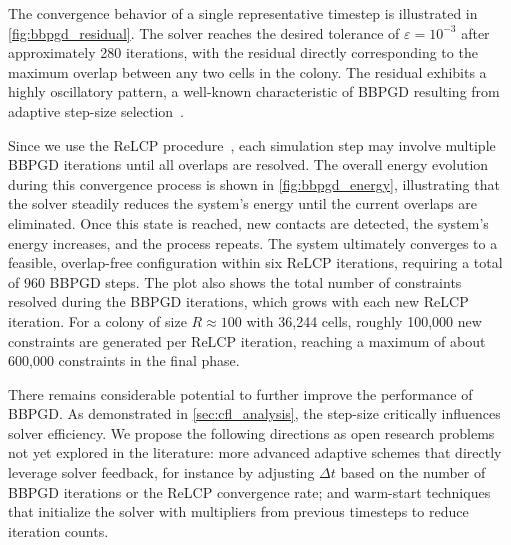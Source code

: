 \documentclass[a4paper,fleqn]{cas-dc}
\begin{document}
The convergence behavior of a single representative timestep is illustrated in \autoref{fig:bbpgd_residual}. The solver reaches the desired tolerance of $\varepsilon = 10^{-3}$ after approximately 280 iterations, with the residual directly corresponding to the maximum overlap between any two cells in the colony. The residual exhibits a highly oscillatory pattern, a well-known characteristic of BBPGD resulting from adaptive step-size selection~\cite{BBPGD,Schneider2021}.

Since we use the ReLCP procedure~\cite{Weady2024SM}, each simulation step may involve multiple BBPGD iterations until all overlaps are resolved. The overall energy evolution during this convergence process is shown in \autoref{fig:bbpgd_energy}, illustrating that the solver steadily reduces the system's energy until the current overlaps are eliminated. Once this state is reached, new contacts are detected, the system's energy increases, and the process repeats. The system ultimately converges to a feasible, overlap-free configuration within six ReLCP iterations, requiring a total of 960 BBPGD steps. The plot also shows the total number of constraints resolved during the BBPGD iterations, which grows with each new ReLCP iteration. For a colony of size $R \approx 100$ with 36,244 cells, roughly 100,000 new constraints are generated per ReLCP iteration, reaching a maximum of about 600,000 constraints in the final phase.

There remains considerable potential to further improve the performance of BBPGD. As demonstrated in \autoref{sec:cfl_analysis}, the step-size critically influences solver efficiency. We propose the following directions as open research problems not yet explored in the literature: more advanced adaptive schemes that directly leverage solver feedback, for instance by adjusting $\Delta t$ based on the number of BBPGD iterations or the ReLCP convergence rate; and warm-start techniques that initialize the solver with multipliers from previous timesteps to reduce iteration counts.
\end{document}
